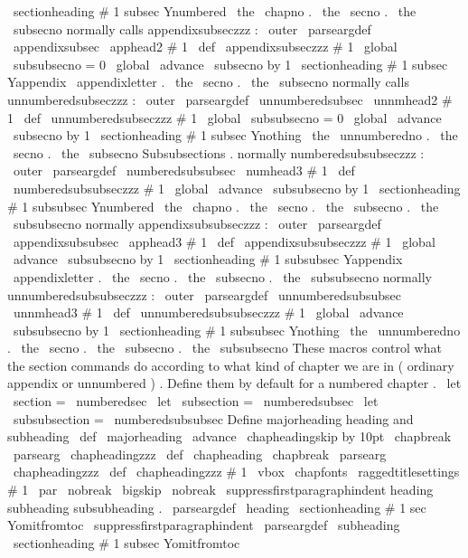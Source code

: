 {{{{\
sectionheading
{
#
1
}
{
subsec
}
{
Ynumbered
}
{
\
the
\
chapno
.
\
the
\
secno
.
\
the
\
subsecno
}
%
}
%
normally
calls
appendixsubseczzz
:
\
outer
\
parseargdef
\
appendixsubsec
{
\
apphead2
{
#
1
}
}
\
def
\
appendixsubseczzz
#
1
{
%
\
global
\
subsubsecno
=
0
\
global
\
advance
\
subsecno
by
1
\
sectionheading
{
#
1
}
{
subsec
}
{
Yappendix
}
%
{
\
appendixletter
.
\
the
\
secno
.
\
the
\
subsecno
}
%
}
%
normally
calls
unnumberedsubseczzz
:
\
outer
\
parseargdef
\
unnumberedsubsec
{
\
unnmhead2
{
#
1
}
}
\
def
\
unnumberedsubseczzz
#
1
{
%
\
global
\
subsubsecno
=
0
\
global
\
advance
\
subsecno
by
1
\
sectionheading
{
#
1
}
{
subsec
}
{
Ynothing
}
%
{
\
the
\
unnumberedno
.
\
the
\
secno
.
\
the
\
subsecno
}
%
}
%
Subsubsections
.
%
%
normally
numberedsubsubseczzz
:
\
outer
\
parseargdef
\
numberedsubsubsec
{
\
numhead3
{
#
1
}
}
\
def
\
numberedsubsubseczzz
#
1
{
%
\
global
\
advance
\
subsubsecno
by
1
\
sectionheading
{
#
1
}
{
subsubsec
}
{
Ynumbered
}
%
{
\
the
\
chapno
.
\
the
\
secno
.
\
the
\
subsecno
.
\
the
\
subsubsecno
}
%
}
%
normally
appendixsubsubseczzz
:
\
outer
\
parseargdef
\
appendixsubsubsec
{
\
apphead3
{
#
1
}
}
\
def
\
appendixsubsubseczzz
#
1
{
%
\
global
\
advance
\
subsubsecno
by
1
\
sectionheading
{
#
1
}
{
subsubsec
}
{
Yappendix
}
%
{
\
appendixletter
.
\
the
\
secno
.
\
the
\
subsecno
.
\
the
\
subsubsecno
}
%
}
%
normally
unnumberedsubsubseczzz
:
\
outer
\
parseargdef
\
unnumberedsubsubsec
{
\
unnmhead3
{
#
1
}
}
\
def
\
unnumberedsubsubseczzz
#
1
{
%
\
global
\
advance
\
subsubsecno
by
1
\
sectionheading
{
#
1
}
{
subsubsec
}
{
Ynothing
}
%
{
\
the
\
unnumberedno
.
\
the
\
secno
.
\
the
\
subsecno
.
\
the
\
subsubsecno
}
%
}
%
These
macros
control
what
the
section
commands
do
according
%
to
what
kind
of
chapter
we
are
in
(
ordinary
appendix
or
unnumbered
)
.
%
Define
them
by
default
for
a
numbered
chapter
.
\
let
\
section
=
\
numberedsec
\
let
\
subsection
=
\
numberedsubsec
\
let
\
subsubsection
=
\
numberedsubsubsec
%
Define
majorheading
heading
and
subheading
\
def
\
majorheading
{
%
{
\
advance
\
chapheadingskip
by
10pt
\
chapbreak
}
%
\
parsearg
\
chapheadingzzz
}
\
def
\
chapheading
{
\
chapbreak
\
parsearg
\
chapheadingzzz
}
\
def
\
chapheadingzzz
#
1
{
%
\
vbox
{
\
chapfonts
\
raggedtitlesettings
#
1
\
par
}
%
\
nobreak
\
bigskip
\
nobreak
\
suppressfirstparagraphindent
}
%
heading
subheading
subsubheading
.
\
parseargdef
\
heading
{
\
sectionheading
{
#
1
}
{
sec
}
{
Yomitfromtoc
}
{
}
\
suppressfirstparagraphindent
}
\
parseargdef
\
subheading
{
\
sectionheading
{
#
1
}
{
subsec
}
{
Yomitfromtoc
}
{
}
\
}}}}
